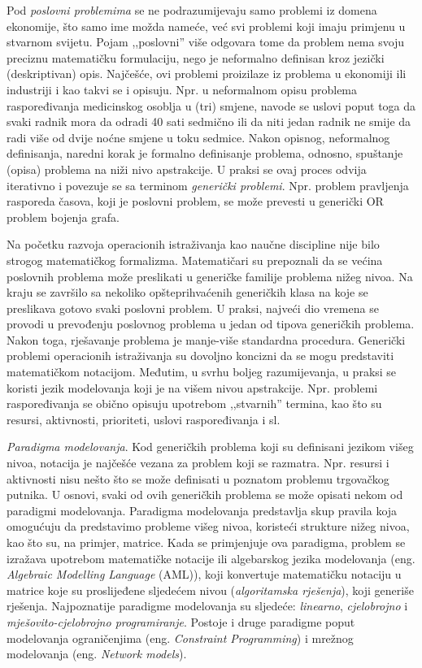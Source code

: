 \documentclass[a4paper, utf8, 11pt, colorlinks]{book}
\theoremstyle{definition}
\begin{document}
 Pod \emph{poslovni problemima}  se ne podrazumijevaju samo problemi iz domena ekonomije, što samo ime možda nameće, već svi problemi koji imaju primjenu u stvarnom svijetu. Pojam ,,poslovni'' više odgovara tome da problem nema svoju preciznu matematičku formulaciju, nego je neformalno definisan kroz jezički (deskriptivan) opis.  Najčešće, ovi problemi proizilaze iz problema u ekonomiji ili industriji i kao takvi se i opisuju. Npr. u neformalnom opisu problema raspoređivanja medicinskog osoblja u (tri) smjene, navode se uslovi poput toga da svaki radnik mora da odradi 40 sati sedmično ili da niti jedan radnik ne smije da radi više od dvije noćne smjene u toku sedmice. Nakon opisnog, neformalnog definisanja, naredni korak 
 je formalno definisanje problema, odnosno, spuštanje (opisa) problema na niži nivo apstrakcije. U praksi se ovaj proces odvija iterativno i povezuje se sa terminom \emph{generički problemi}. Npr. problem pravljenja rasporeda časova, koji je poslovni problem, se može prevesti u generički OR problem bojenja grafa.

Na početku razvoja operacionih istraživanja kao naučne discipline nije bilo strogog matematičkog formalizma. Matematičari su prepoznali da se većina poslovnih problema može  preslikati u generičke familije problema nižeg nivoa. Na kraju se završilo sa nekoliko opšteprihvaćenih generičkih klasa na koje se preslikava gotovo svaki poslovni problem. U praksi, najveći dio vremena se provodi u prevođenju poslovnog problema u jedan od tipova generičkih problema. Nakon toga, rješavanje problema je manje-više standardna procedura. Generički problemi operacionih istraživanja su dovoljno koncizni da se mogu predstaviti  matematičkom notacijom. Međutim, u svrhu boljeg razumijevanja, u praksi se koristi jezik modelovanja koji je na višem nivou apstrakcije. Npr. problemi raspoređivanja se obično opisuju upotrebom ,,stvarnih'' termina, kao što su resursi, aktivnosti, prioriteti, uslovi raspoređivanja i sl.  

 \emph{Paradigma modelovanja}. Kod generičkih problema koji su definisani jezikom višeg nivoa, notacija je najčešće vezana za problem koji se razmatra.
 Npr. resursi i aktivnosti nisu nešto što se može definisati u poznatom problemu trgovačkog putnika. U osnovi, svaki od ovih generičkih problema se može opisati nekom od paradigmi modelovanja. Paradigma modelovanja predstavlja skup pravila koja omogućuju da predstavimo probleme višeg nivoa, koristeći strukture nižeg nivoa, kao što su, na primjer, matrice. Kada se primjenjuje ova paradigma, problem se izražava upotrebom matematičke notacije ili algebarskog jezika modelovanja (eng. \emph{Algebraic Modelling Language} (AML)), koji konvertuje matematičku notaciju u matrice koje su proslijeđene sljedećem nivou (\emph{algoritamska rješenja}), koji generiše rješenja. Najpoznatije paradigme modelovanja su sljedeće: \textit{linearno}, \textit{cjelobrojno} i \textit{mješovito-cjelobrojno programiranje}. Postoje i druge paradigme poput modelovanja ograničenjima (eng. \emph{Constraint Programming}) i mrežnog modelovanja (eng. \emph{Network models}). 
\end{document}
